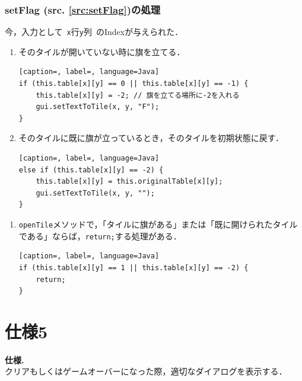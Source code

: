 \documentclass[a4j,11pt]{jsarticle}
\newcommand{\srcref}[1]{src. \ref{#1}}
\newcommand{\met}[1]{\ttfamily #1 \normalfont (\srcref{src:#1})の処理}
\renewcommand{\labelenumi}{\textbf{\arabic{enumi})\ }}
\begin{document}
\subsubsection*{\met{setFlag}}
今，入力として\ \verb|x|行\verb|y|列\ のIndexが与えられた．
\begin{enumerate}
    \item そのタイルが開いていない時に旗を立てる．
          \begin{lstlisting}[caption=, label=, language=Java]
if (this.table[x][y] == 0 || this.table[x][y] == -1) {
    this.table[x][y] = -2; // 旗を立てる場所に-2を入れる
    gui.setTextToTile(x, y, "F");
}
    \end{lstlisting}
    \item そのタイルに既に旗が立っているとき，そのタイルを初期状態に戻す．
          \begin{lstlisting}[caption=, label=, language=Java]
else if (this.table[x][y] == -2) {
    this.table[x][y] = this.originalTable[x][y];
    gui.setTextToTile(x, y, "");
}
    \end{lstlisting}
\end{enumerate}
\dotfill
\begin{enumerate}
    \renewcommand{\labelenumi}{}
    \item \verb|openTile|メソッドで，「タイルに旗がある」または「既に開けられたタイルである」ならば，\verb|return;|する処理がある．
          \begin{lstlisting}[caption=, label=, language=Java]
if (this.table[x][y] == 1 || this.table[x][y] == -2) {
    return;
}
        \end{lstlisting}
\end{enumerate}
\newpage
\section*{仕様5}
\setcounter{section}{5}
\setcounter{subsection}{0}
\begin{screen}
    \textbf{仕様\thesection.}\\
    クリアもしくはゲームオーバーになった際，適切なダイアログを表示する．
\end{screen}
\end{document}
